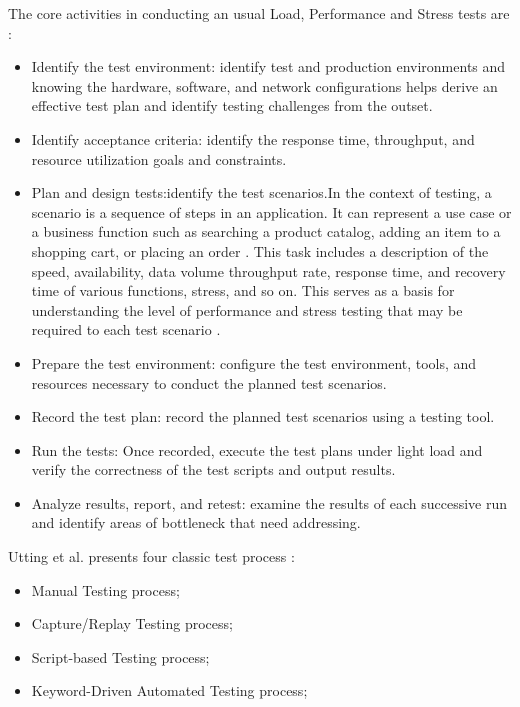 \documentclass[espaco=umemeio,chapter=TITLE,twoside,openright]{abnt}
\begin{document}
The core activities in conducting an usual Load, Performance and Stress tests are \cite{Erinle2013}:

\begin{itemize}
\item Identify the test environment: identify test and production environments and knowing the hardware, software, and network configurations helps derive an effective test plan and identify testing challenges from the outset.

\item Identify acceptance criteria: identify the response time, throughput, and resource utilization goals and constraints.

\item Plan and design tests:identify the test scenarios.In the context of testing, a scenario is a sequence of steps in an application. It can represent a use case or a business function such as searching a product catalog, adding an item to a shopping cart, or placing an order \cite{Corporation2007}. This task includes a description
of the speed, availability, data volume throughput rate, response
time, and recovery time of various functions, stress, and so on. This
serves as a basis for understanding the level of performance and
stress testing that may be required to each test scenario \cite{Lewis2005}.

\item Prepare the test environment: configure the test environment, tools, and resources necessary to conduct the planned test scenarios.

\item Record the test plan: record the planned test scenarios using a testing tool.

\item Run the tests: Once recorded, execute the test plans under light load and verify the correctness of the test scripts and output results.

\item Analyze results, report, and retest: examine the results of each successive run and identify areas of bottleneck that need addressing.

\end{itemize}

Utting et al. presents four classic test process \cite{utting2010practical}: 

\begin{itemize}
\item Manual Testing process;
\item Capture/Replay Testing process; 
\item Script-based Testing process;
\item Keyword-Driven Automated Testing process;

\end{itemize}
\end{document}
